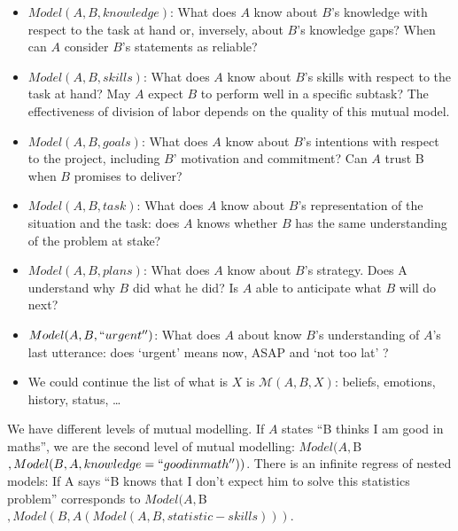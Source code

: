 \documentclass[twocolumn]{article}
\newcommand{\model}[3]{{$\mathcal{M}(#1, #2, #3)$}}
\begin{document}
\begin{itemize}

    \item $Model(A,B, knowledge)$: What does $A$ know about $B$'s knowledge with
        respect to the task at hand or, inversely, about $B$'s knowledge gaps?
        When can $A$ consider $B$'s statements as reliable? 

    \item $Model(A,B, skills)$: What does $A$ know about $B$'s skills with respect to
        the task at hand? May $A$ expect $B$ to perform well in a specific subtask?
        The effectiveness of division of labor depends on the quality of this
        mutual model. 

    \item $Model(A,B, goals)$: What does $A$ know about $B$'s intentions with respect
        to the project, including $B$' motivation and commitment? Can $A$ trust B
        when $B$ promises to deliver? 

    \item $Model(A,B, task)$: What does $A$ know about $B$'s representation of the
        situation and the task: does $A$ knows whether $B$ has the same
        understanding of the problem at stake? 

    \item $Model(A,B, plans)$: What does $A$ know about $B$'s strategy. Does A
        understand why $B$ did what he did? Is $A$ able to anticipate what $B$ will do
        next? 

    \item $Model(A,B, ``urgent'')$: What does $A$ about know $B$'s understanding of $A$'s
        last utterance: does ‘urgent' means now, ASAP and ‘not too lat' ?

    \item We could continue the list of what is $X$ is \model{A}{B}{X}: beliefs,
        emotions, history, status, …

\end{itemize}

We have different levels of mutual modelling. If $A$ states ``B thinks I am good in
maths'', we are the second level of mutual modelling:  $Model(A, $B$, Model(B,A,
knowledge=``good in math''))$. There is an infinite regress of nested models: If A
says ``B knows that I don't expect him to solve this statistics problem''
corresponds to $Model(A, $B$, Model (B, A (Model (A,B, statistic-skills)))$.
\end{document}
